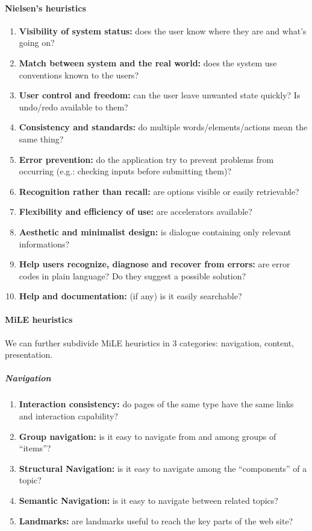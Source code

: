 \paragraph*{Nielsen's heuristics}

\begin{enumerate}[start=1,label={\bf H\arabic{*}}]
    \item \textbf{Visibility of system status:} does the user know where they are and    
          what's going on?
    \item \textbf{Match between system and the real world:} does the system use 
          conventions known to the users?
    \item \textbf{User control and freedom:} can the user leave unwanted state quickly? 
          Is undo/redo available to them?
    \item \textbf{Consistency and standards:} do multiple words/elements/actions mean    
          the same thing?
    \item \textbf{Error prevention:} do the application try to prevent problems 
          from occurring (e.g.: checking inputs before submitting them)?
    \item \textbf{Recognition rather than recall:} are options visible or easily 
          retrievable?
    \item \textbf{Flexibility and efficiency of use:} are accelerators available?
    \item \textbf{Aesthetic and minimalist design:} is dialogue containing only relevant 
          informations?
    \item \textbf{Help users recognize, diagnose and recover from errors:} are error 
          codes in plain language? Do they suggest a possible solution?
    \item \textbf{Help and documentation:} (if any) is it easily searchable?
\end{enumerate}

\paragraph*{MiLE heuristics}

We can further subdivide MiLE heuristics in 3 categories: navigation, content, presentation.

\subparagraph*{Navigation}

\begin{enumerate}[start=1,label={\bf MN\arabic{*}}]
    \item \textbf{Interaction consistency:} do pages of the same type have the same links
          and interaction capability?
    \item \textbf{Group navigation:} is it easy to navigate from and among groups of
          ``items''?
    \item \textbf{Structural Navigation:} is it easy to navigate among the ``components'' of a topic?
    \item \textbf{Semantic Navigation:} is it easy to navigate between related topics?
    \item \textbf{Landmarks:} are landmarks useful to reach the key parts of the web
          site?
\end{enumerate}

